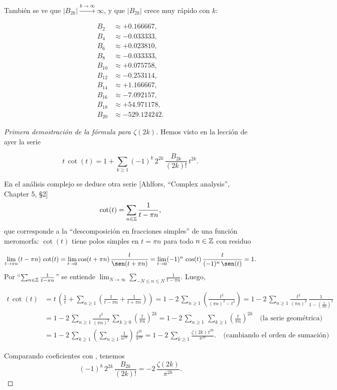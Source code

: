 \documentclass{article}
\begin{document}
También se ve que $|B_{2k}| \xrightarrow{k \to \infty} \infty$, y que $|B_{2k}|$ crece muy rápido con $k$:

\begin{align*}
B_2 & \approx +0.166667,\\
B_4 & \approx -0.033333,\\
B_6 & \approx +0.023810,\\
B_8 & \approx -0.033333,\\
B_{10} & \approx +0.075758,\\
B_{12} & \approx -0.253114,\\
B_{14} & \approx +1.166667,\\
B_{16} & \approx -7.092157,\\
B_{18} & \approx +54.971178,\\
B_{20} & \approx -529.124242.
\end{align*}

\begin{proof}[Primera demostración de la fórmula para $\zeta (2k)$]
Hemos visto en la lección de ayer la serie

\begin{equation}
\label{eqn:serie-para-t-cot-t}
t\,\cot (t) = 1 + \sum_{k \ge 1} (-1)^k \, 2^{2k}\,\frac{B_{2k}}{(2k)!}\,t^{2k}.
\end{equation}

En el análisis complejo se deduce otra serie [Ahlfors, ``Complex analysis'', Chapter 5, \S 2]
$$\cot (t) = \sum_{n\in \mathbb{Z}} \frac{1}{t - \pi n},$$
que corresponde a la ``descomposición en fracciones simples'' de una función meromorfa: $\cot (t)$ tiene polos simples en $t = \pi n$ para todo $n \in \mathbb{Z}$ con residuo

$$\lim_{t \to \pi n} (t - \pi n)\,\cot (t) = \lim_{t \to 0} \cos (t+\pi n) \, \frac{t}{\sen (t + \pi n)} = \lim_{t \to 0} (-1)^n\,\cos (t) \, \frac{t}{(-1)^n\,\sen (t)} = 1.$$
Por ``$\sum_{n\in \mathbb{Z}} \frac{1}{t - \pi n}$'' se entiende $\lim_{N\to \infty} \sum_{-N \le n \le N} \frac{1}{t - \pi n}$.
Luego,

\begin{align*}
t\,\cot (t) & = t\,\left(\frac{1}{t} + \sum_{n \ge 1} \left(\frac{1}{t - \pi n} + \frac{1}{t + \pi n}\right)\right) = 1 - 2\,\sum_{n \ge 1} \left(\frac{t^2}{(\pi n)^2 - t^2}\right) = 1 - 2\,\sum_{n \ge 1} \frac{t^2}{(\pi n)^2} \, \frac{1}{1-\left(\frac{t}{\pi n}\right)^2} \\
 & = 1 - 2\,\sum_{n \ge 1} \frac{t^2}{(\pi n)^2} \, \sum_{k \ge 0} \left(\frac{t}{\pi n}\right)^{2k} = 1 - 2\,\sum_{n \ge 1} \, \sum_{k \ge 1} \left(\frac{t}{\pi n}\right)^{2k} \quad \text{(la serie geométrica)}\\
 & = 1 - 2\,\sum_{k \ge 1} \left(\sum_{n\ge 1} \frac{1}{n^{2k}}\right)\,\frac{t^{2k}}{\pi^{2k}} = 1 - 2\,\sum_{k\ge 1} \frac{\zeta (2k)\,t^{2k}}{\pi^{2k}}. \quad \text{(cambiando el orden de sumación)}
\end{align*}

Comparando coeficientes con , tenemos
$$(-1)^k \, 2^{2k}\,\frac{B_{2k}}{(2k)!} = -2\,\frac{\zeta (2k)}{\pi^{2k}}.$$
\end{proof}
\end{document}

